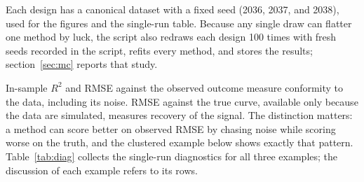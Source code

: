 \documentclass[bib]{statapress}
\begin{document}
Each design has a canonical dataset with a fixed seed (2036, 2037, and 2038),
used for the figures and the single-run table.  Because any single draw can
flatter one method by luck, the script also redraws each design 100 times
with fresh seeds recorded in the script, refits every method, and stores the
results; section~\ref{sec:mc} reports that study.

In-sample $R^2$ and RMSE against the observed outcome measure conformity to
the data, including its noise.  RMSE
against the true curve, available only because the data are simulated,
measures recovery of the signal.  The distinction matters: a method can score
better on observed RMSE by chasing noise while scoring worse on the truth,
and the clustered example below shows exactly that pattern.
Table~\ref{tab:diag} collects the single-run diagnostics for all three
examples; the discussion of each example refers to its rows.
\end{document}
